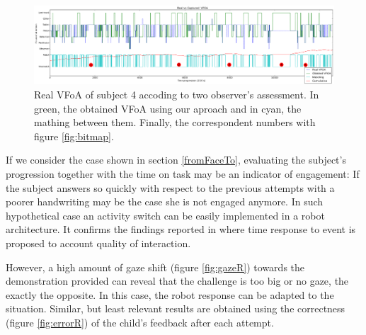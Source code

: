 \documentclass{sig-alternate}
\begin{document}
\begin{figure}
    \centering
    \includegraphics[width=1.81\columnwidth]{realCaptured}
    \caption{\small Real VFoA of subject 4 accoding to two observer's
    assessment. In green, the obtained VFoA using our aproach and in cyan, the
    mathing between them. Finally, the correspondent numbers with figure \ref{fig:bitmap}.}

    \label{fig:realCaptured}
\end{figure}

If we consider the case shown in section \ref{fromFaceTo}, evaluating the
subject's progression together with the time on task may be an indicator of
engagement: If the subject answers so quickly with respect to the previous
attempts with a poorer handwriting may be the case she is not engaged anymore.
In such hypothetical case an activity switch can be easily implemented in a
robot architecture. It confirms the findings reported in \cite{anzalone} where
time response to event is proposed to account quality of interaction. 

However, a high amount of gaze shift (figure \ref{fig:gazeR}) towards the
demonstration provided can reveal that the challenge is too big or no gaze, the
exactly the opposite. In this case, the robot response can be adapted to the
situation. Similar, but least relevant results are obtained using the
correctness (figure \ref{fig:errorR}) of the child's feedback after each
attempt. 
\end{document}

